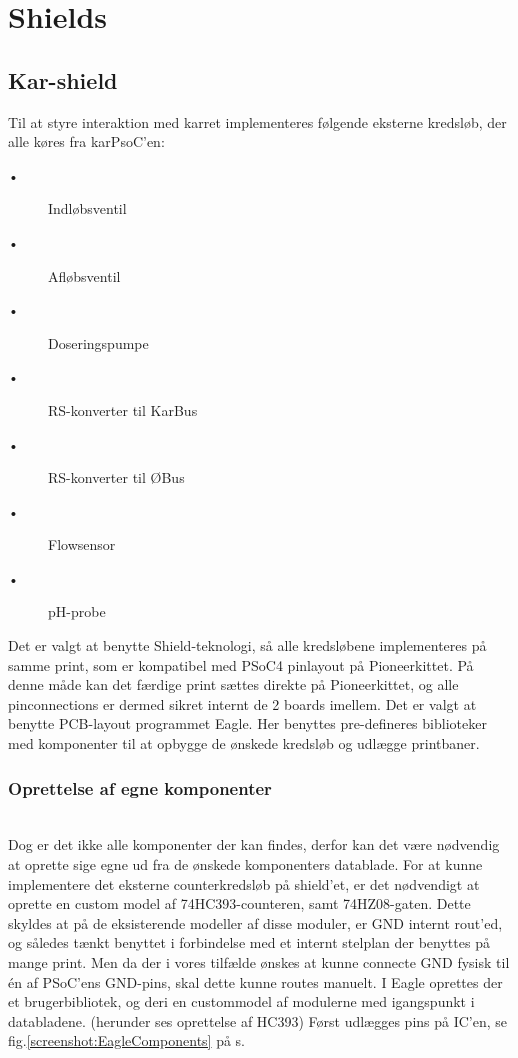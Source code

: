 
\section{Shields}
\subsection{Kar-shield}

Til at styre interaktion med karret implementeres følgende eksterne kredsløb, der alle køres fra karPsoC'en: 

\begin{description}
 \item[•] Indløbsventil
 \item[•] Afløbsventil
 \item[•] Doseringspumpe
 \item[•] RS-konverter til KarBus
 \item[•] RS-konverter til ØBus
 \item[•] Flowsensor
 \item[•] pH-probe
\end{description}
 
Det er valgt at benytte Shield-teknologi, så alle kredsløbene implementeres på samme print, som er kompatibel med PSoC4 pinlayout på Pioneerkittet. På denne måde kan det færdige print sættes direkte på Pioneerkittet, og alle pinconnections er dermed sikret internt de 2 boards imellem. 
Det er valgt at benytte PCB-layout programmet Eagle. Her benyttes pre-defineres biblioteker med komponenter til at opbygge de ønskede kredsløb og udlægge printbaner.  

\subsubsection{Oprettelse af egne komponenter} \hspace{0pt} \\
Dog er det ikke alle komponenter der kan findes, derfor kan det være nødvendig at oprette sige egne ud fra de ønskede komponenters datablade. 
For at kunne implementere det eksterne counterkredsløb på shield'et, er det nødvendigt at oprette en custom model af 74HC393-counteren, samt 74HZ08-gaten.
Dette skyldes at på de eksisterende modeller af disse moduler, er GND internt rout'ed, og således tænkt benyttet i forbindelse med et internt stelplan der benyttes på mange print. Men da der i vores tilfælde ønskes at kunne connecte GND fysisk til én af PSoC'ens GND-pins, skal dette kunne routes manuelt.
I Eagle oprettes der et brugerbibliotek, og deri en custommodel af modulerne med igangspunkt i databladene. (herunder ses oprettelse af HC393)
Først udlægges pins på IC'en, se fig.\ref{screenshot:EagleComponents} på s. \pageref{screenshot:EagleComponents}


